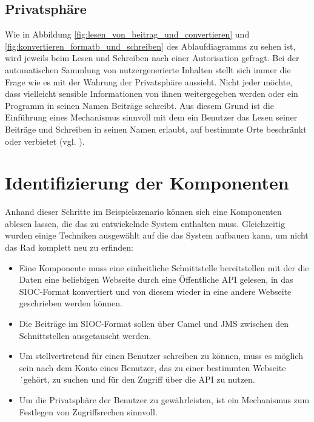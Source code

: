 
\subsection{Privatsphäre} %
\label{sub:privatsphäre}

Wie in Abbildung \ref{fig:lesen_von_beitrag_und_convertieren} und \ref{fig:konvertieren_formatb_und_schreiben} des Ablaufdiagramms zu sehen ist, wird jeweils beim Lesen und Schreiben nach einer Autorisation gefragt. Bei der automatischen Sammlung von nutzergenerierte Inhalten stellt sich immer die Frage wie es mit der Wahrung der Privatsphäre aussieht. Nicht jeder möchte, dass vielleicht sensible Informationen von ihnen weitergegeben werden oder ein Programm in seinen Namen Beiträge schreibt. Aus diesem Grund ist die Einführung eines Mechanismus sinnvoll mit dem ein Benutzer das Lesen seiner Beiträge und Schreiben in seinen Namen erlaubt, auf bestimmte Orte beschränkt oder verbietet (vgl. \cite[S.\,7]{Bojars2011}). 


\section{Identifizierung der Komponenten} %
\label{sec:identifizierung_der_komponenten}

Anhand dieser Schritte im Beispielszenario können sich eine Komponenten ablesen lassen, die das zu entwickelnde System enthalten muss. Gleichzeitig wurden einige Techniken ausgewählt auf die das System aufbauen kann, um nicht das Rad komplett neu zu erfinden: 

\begin{itemize} 
    \item Eine Komponente muss eine einheitliche Schnittstelle bereitstellen mit der die Daten eine beliebigen Webseite durch eine Öffentliche API gelesen, in das SIOC-Format konvertiert und von diesem wieder in eine andere Webseite geschrieben werden können. 

    \item Die Beiträge im SIOC-Format sollen über Camel und JMS zwischen den Schnittstellen ausgetauscht werden.

    \item Um stellvertretend für einen Benutzer schreiben zu können, muss es möglich sein nach dem Konto eines Benutzer, das zu einer bestimmten Webseite´gehört, zu suchen und für den Zugriff über die API zu nutzen.

    \item Um die Privatsphäre der Benutzer zu gewährleisten, ist ein Mechanismus zum Festlegen von Zugriffsrechen sinnvoll.
\end{itemize}   


